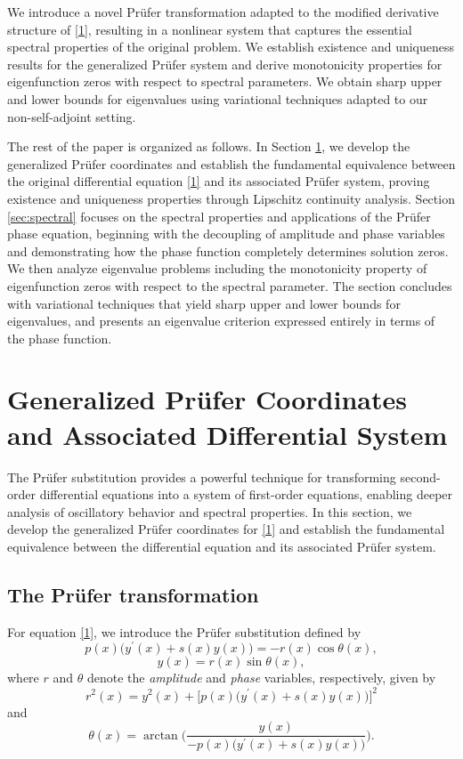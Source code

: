 \documentclass[11pt, reqno]{amsart}
\numberwithin{equation}{section}  %
\theoremstyle{plain}
\theoremstyle{definition}
\theoremstyle{remark}
\begin{document}
{We introduce a novel Pr\"ufer transformation adapted to the modified derivative structure of \eqref{1},} resulting in a nonlinear system that captures the essential spectral properties of the original problem. We establish existence and uniqueness results for the generalized Pr\"ufer system and derive monotonicity properties for eigenfunction zeros with respect to spectral parameters. We obtain sharp upper and lower bounds for eigenvalues using variational techniques adapted to our non-self-adjoint setting. 

The rest of the paper is organized as follows. In Section \ref{sec:prufer}, we develop the generalized Pr\"ufer coordinates and establish the fundamental equivalence between the original differential equation \eqref{1} and its associated Pr\"ufer system, proving existence and uniqueness properties through Lipschitz continuity analysis. Section \ref{sec:spectral} focuses on the spectral properties and applications of the Pr\"ufer phase equation, beginning with the decoupling of amplitude and phase variables and demonstrating how the phase function completely determines solution zeros. We then analyze eigenvalue problems including the monotonicity property of eigenfunction zeros with respect to the spectral parameter. The section concludes with variational techniques that yield sharp upper and lower bounds for eigenvalues, and presents an eigenvalue criterion expressed entirely in terms of the phase function.


\section{Generalized Pr\"ufer Coordinates and Associated Differential System}
\label{sec:prufer}
The Pr\"ufer substitution provides a powerful technique for transforming second-order differential equations into a system of first-order equations, enabling deeper analysis of oscillatory behavior and spectral properties. In this section, we develop the generalized Pr\"ufer coordinates for \eqref{1} and establish the fundamental equivalence between {the differential equation} and its associated Pr\"ufer system.
\subsection{The Pr\"ufer transformation}
{For equation \eqref{1}, we introduce the Pr\"ufer substitution defined by}
\begin{equation}\label{2} 
p(x) \big(y^\prime (x)+s(x)y(x)\big)=-r(x)\cos\theta (x),
\end{equation} 
\begin{equation} \label{3} y(x)=r(x)\sin\theta (x),
\end{equation}
where $r$ and $\theta$ denote the \textit{amplitude} and \textit{phase} variables, respectively, given by
\begin{equation} \label{r}
r^2 (x)=y^2 (x)+\big[p(x)\big(y^\prime (x)+s(x)y(x)\big)\big]^2
\end{equation}
and 
\begin{equation} \label{theta}
\theta(x)=\arctan \bigg(\dfrac{y(x)}{-p(x) \big(y^\prime (x)+s(x)y(x)\big)}\bigg).
\end{equation}
\end{document}
